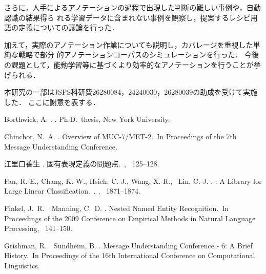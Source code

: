 \documentclass[japanese]{jnlp_1.4}
\begin{document}
さらに，人手によるアノテーションの過程で出現した判断の難しい事例や，自動認識の結果得ら
れる学習データに含まれない事例を観察し，提案するレシピ用語の定義についての議論を行った．

加えて，実際のアノテーション作業についても説明し，カバレージを重視した単純な戦略で部分
的アノテーションコーパスのシミュレーションを行った．
今後の課題として，能動学習等に基づくより効率的なアノテーションを行うことが挙げられる．


\acknowledgment

本研究の一部はJSPS科研費26280084，24240030，26280039の助成を受けて実施した．
ここに謝意を表する．



\begin{thebibliography}{}

Borthwick, A. \BBCP.
.
\newblock Ph.D.\ thesis, New York University.

Chinchor, N.~A. \BBCP.
\newblock \BBOQ Overview of MUC-7/MET-2.\BBCQ\
\newblock In {\Bem Proceedings of the 7th Message Understanding Conference}.

江里口善生 \BBCP.
\newblock 固有表現定義の問題点.\
\newblock {}, \mbox{\BPGS\ 125--128}.

Fan, R.-E., Chang, K.-W., Hsieh, C.-J., Wang, X.-R., \BBA\ Lin, C.-J. \BBOP
  2008\BBCP.
\newblock \BBOQ {LIBLINEAR}: A Library for Large Linear Classification.\BBCQ\
, {}, \mbox{\BPGS\
  1871--1874}.

Finkel, J.~R.\BBACOMMA\ \BBA\ Manning, C.~D. \BBOP 2009\BBCP.
\newblock \BBOQ Nested Named Entity Recognition.\BBCQ\
\newblock In {\Bem Proceedings of the 2009 Conference on Empirical Methods in
  Natural Language Processing}, \mbox{\BPGS\ 141--150}.

Grishman, R.\BBACOMMA\ \BBA\ Sundheim, B. \BBOP 1996\BBCP.
\newblock \BBOQ Message Understanding Conference - 6: A Brief History.\BBCQ\
\newblock In {\Bem Proceedings of the 16th International Conference on
  Computational Linguistics}.


\end{thebibliography}
\end{document}
